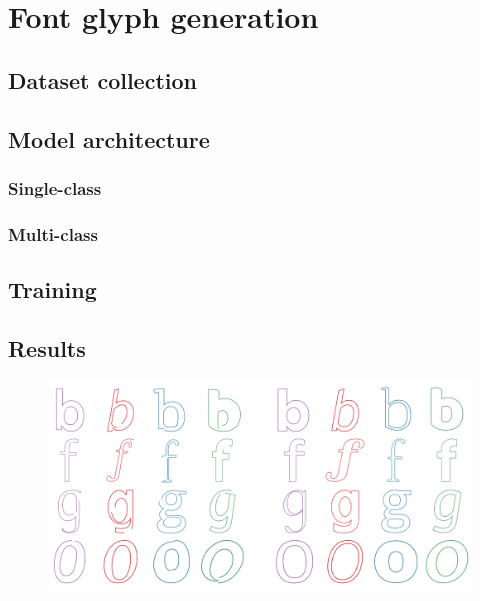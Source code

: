 \chapter{Font glyph generation}
\section{Dataset collection}\label{sec:font-data}
\section{Model architecture}\label{sec:architecture}
\subsection{Single-class}
\subsection{Multi-class}
\section{Training}
\section{Results}
\begin{figure}[t]
	\includegraphics[width=\textwidth]{figures/font_gen}
    \caption[Visual results of training ]{\label{fig:font_gen}}
\end{figure}
